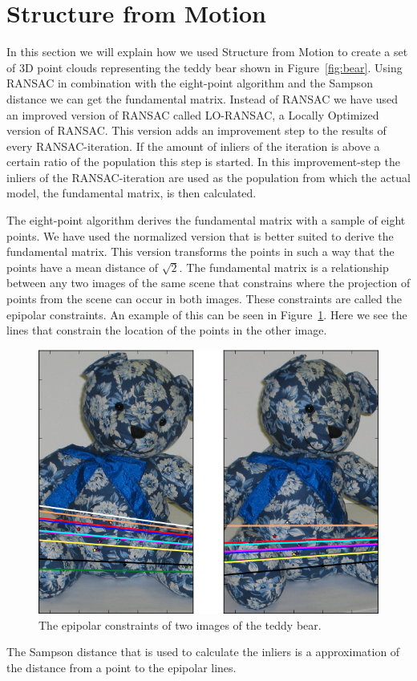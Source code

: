 \section{Structure from Motion}
\label{structure}
In this section we will explain how we used Structure from Motion\cite{SfM} to create a set of 3D point clouds
representing the teddy bear shown in Figure~\ref{fig:bear}.
Using RANSAC\cite{ransac} in combination with the eight-point algorithm\cite{eightpoint} and the Sampson distance we can get the fundamental matrix.
Instead of RANSAC we have used an improved version of RANSAC called LO-RANSAC, a Locally Optimized version of RANSAC.
This version adds an improvement step to the results of every RANSAC-iteration. If the amount of inliers of the iteration is above a certain ratio of the population this step is started.
In this improvement-step the inliers of the RANSAC-iteration are used as the population from which the actual model, the fundamental matrix, is then calculated.

The eight-point algorithm derives the fundamental matrix with a sample of eight points.
We have used the normalized version that is better suited to derive the fundamental matrix.
This version transforms the points in such a way that the points have a mean distance of $\sqrt{2}$.
The fundamental matrix is a relationship between any two images of the same scene that constrains where the projection of points from the scene can occur in both images.
These constraints are called the epipolar constraints.
An example of this can be seen in Figure~\ref{fig:epipolar}.
Here we see the lines that constrain the location of the points in the other image.
\begin{figure}[ht]
	\centering
	\includegraphics[width=.5\textwidth]{bear_epi}
	\caption{The epipolar constraints of two images of the teddy bear.}
	\label{fig:epipolar}
\end{figure}

The Sampson distance that is used to calculate the inliers is a approximation of the distance from a point to the epipolar lines.

